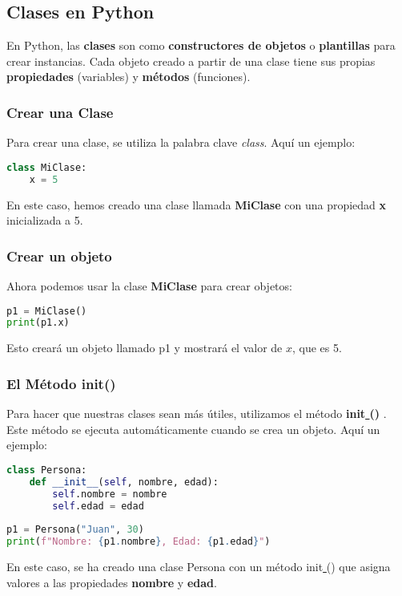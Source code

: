 \documentclass[conference]{IEEEtran}
\begin{document}
	\subsection{Clases en Python}
		En Python, las \textbf{clases} son como \textbf{constructores de objetos} o 
		\textbf{plantillas} para crear instancias. Cada objeto creado a partir de
		una clase tiene sus propias \textbf{propiedades} (variables) y \textbf{métodos} (funciones).
		\subsubsection{Crear una Clase}
		Para crear una clase, se utiliza la palabra clave \textit{class}. Aquí un ejemplo:
		\begin{lstlisting}[language=Python,basicstyle=\small,caption=Creación de una clase en Python]
class MiClase:
	x = 5
		\end{lstlisting}
		En este caso, hemos creado una clase llamada \textbf{MiClase} con una propiedad \textbf{x}
		inicializada a 5.
		\subsubsection{Crear un objeto}
		Ahora podemos usar la clase \textbf{MiClase} para crear objetos:
		\begin{lstlisting}[language=Python,basicstyle=\small,caption=Creación de un objeto en Python]
p1 = MiClase()
print(p1.x)
		\end{lstlisting}
		Esto creará un objeto llamado p1 y mostrará el valor de $x$, que es 5.
		\subsubsection{El Método init()}
		Para hacer que nuestras clases sean más útiles, utilizamos el método
		\textbf{\underline{  }init\underline{  }()} .
		Este método se ejecuta automáticamente cuando se crea un objeto. Aquí
		un ejemplo:
		\begin{lstlisting}[language=Python,basicstyle=\small,caption=Creación de un objeto en Python]
class Persona:
	def __init__(self, nombre, edad):
		self.nombre = nombre
		self.edad = edad
		
p1 = Persona("Juan", 30)
print(f"Nombre: {p1.nombre}, Edad: {p1.edad}")
		\end{lstlisting}
		En este caso, se ha creado una clase Persona con un método \underline{  }init\underline{  }()
		que asigna valores a las propiedades \textbf{nombre} y \textbf{edad}.
\end{document}
